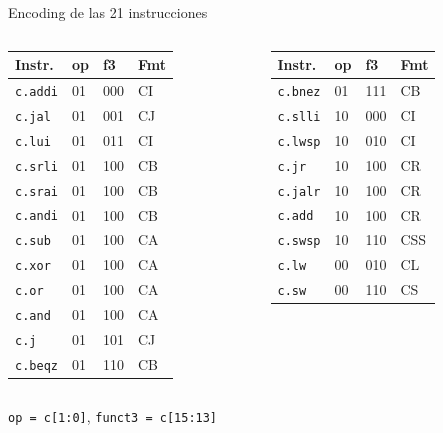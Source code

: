 \documentclass{beamer}
\begin{document}
\begin{frame}[fragile]{Encoding de las 21 instrucciones}
  \tiny
  \begin{columns}
    \begin{tabular}{@{}llll@{}}
      \toprule
      \textbf{Instr.} & \textbf{op} & \textbf{f3} & \textbf{Fmt} \\
      \midrule
      \texttt{c.addi} & 01 & 000 & CI \\
      \texttt{c.jal}  & 01 & 001 & CJ \\
      \texttt{c.lui}  & 01 & 011 & CI \\
      \texttt{c.srli} & 01 & 100 & CB \\
      \texttt{c.srai} & 01 & 100 & CB \\
      \texttt{c.andi} & 01 & 100 & CB \\
      \texttt{c.sub}  & 01 & 100 & CA \\
      \texttt{c.xor}  & 01 & 100 & CA \\
      \texttt{c.or}   & 01 & 100 & CA \\
      \texttt{c.and}  & 01 & 100 & CA \\
      \texttt{c.j}    & 01 & 101 & CJ \\
      \texttt{c.beqz} & 01 & 110 & CB \\
      \bottomrule
    \end{tabular}
    \begin{tabular}{@{}llll@{}}
      \toprule
      \textbf{Instr.} & \textbf{op} & \textbf{f3} & \textbf{Fmt} \\
      \midrule
      \texttt{c.bnez} & 01 & 111 & CB \\
      \texttt{c.slli} & 10 & 000 & CI \\
      \texttt{c.lwsp} & 10 & 010 & CI \\
      \texttt{c.jr}   & 10 & 100 & CR \\
      \texttt{c.jalr} & 10 & 100 & CR \\
      \texttt{c.add}  & 10 & 100 & CR \\
      \texttt{c.swsp} & 10 & 110 & CSS \\
      \texttt{c.lw}   & 00 & 010 & CL \\
      \texttt{c.sw}   & 00 & 110 & CS \\
      \bottomrule
    \end{tabular}
  \end{columns}
  \vspace{2mm}
  \small\centering \texttt{op = c[1:0]}, \texttt{funct3 = c[15:13]}
\end{frame}
\end{document}

